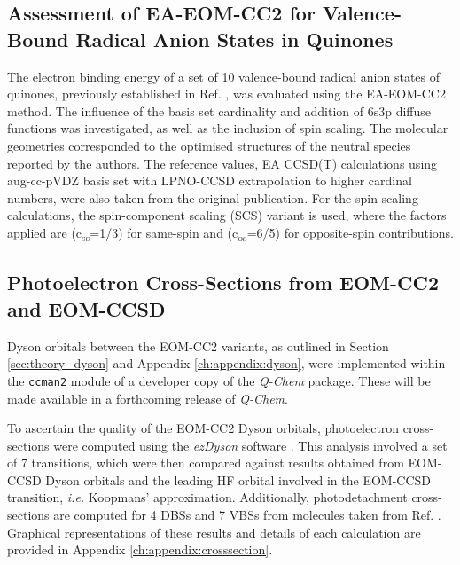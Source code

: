 \subsection{Assessment of EA-EOM-CC2 for Valence-Bound Radical Anion States in Quinones}

The electron binding energy of a set of 10 valence-bound radical anion states of quinones, previously established in Ref. , was evaluated using the EA-EOM-CC2 method. The influence of the basis set cardinality and addition of 6s3p diffuse functions was investigated, as well as the inclusion of spin scaling. The molecular geometries corresponded to the optimised structures of the neutral species reported by the authors. The reference values, EA CCSD(T) calculations using aug-cc-pVDZ basis set with LPNO-CCSD extrapolation to higher cardinal numbers, were also taken from the original publication. For the spin scaling calculations, the spin-component scaling (SCS) variant is used, where the factors applied are (c\textsubscript{ss}=1/3) for same-spin and (c\textsubscript{os}=6/5) for opposite-spin contributions\cite{grimme2003improved,shaalan2022accurate}.\\

\subsection{Photoelectron Cross-Sections from EOM-CC2 and EOM-CCSD}

Dyson orbitals between the EOM-CC2 variants, as outlined in Section \ref{sec:theory_dyson} and Appendix \ref{ch:appendix:dyson}, were implemented within the \texttt{ccman2} module of a developer copy of the \textit{Q-Chem} package. These will be made available in a forthcoming release of \textit{Q-Chem}.

To ascertain the quality of the EOM-CC2 Dyson orbitals, photoelectron cross-sections were computed using the \textit{ezDyson} software \cite{gozem2022ezspectra,gozem2015photoionization}. This analysis involved a set of 7 transitions, which were then compared against results obtained from EOM-CCSD Dyson orbitals and the leading HF orbital involved in the EOM-CCSD transition, \textit{i.e.} Koopmans' approximation. 
Additionally, photodetachment cross-sections are computed for 4 DBSs and 7 VBSs from  molecules taken from Ref. . Graphical representations of these results and details of each calculation are provided in Appendix \ref{ch:appendix:crosssection}.\\

